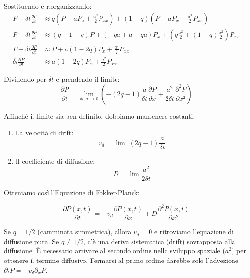 Sostituendo e riorganizzando:
\begin{equation}
\begin{aligned}
P + \delta t \frac{\partial P}{\partial t} &\approx q \left( P - a P_x + \frac{a^2}{2} P_{xx} \right) + (1-q) \left( P + a P_x + \frac{a^2}{2} P_{xx} \right) \\
P + \delta t \frac{\partial P}{\partial t} &\approx (q+1-q)P + (-qa + a - qa) P_x + \left(q \frac{a^2}{2} + (1-q)\frac{a^2}{2}\right) P_{xx} \\
P + \delta t \frac{\partial P}{\partial t} &\approx P + a(1-2q) P_x + \frac{a^2}{2} P_{xx} \\  
\delta t \frac{\partial P}{\partial t} &\approx  a(1-2q) P_x + \frac{a^2}{2} P_{xx}
\end{aligned}
\end{equation}

Dividendo per $\delta t$ e prendendo il limite:
\begin{equation}
\frac{\partial P}{\partial t} = \lim_{\delta t, a \to 0} \left( -(2q-1)\frac{a}{\delta t} \frac{\partial P}{\partial x} + \frac{a^2}{2 \delta t} \frac{\partial^2 P}{\partial x^2} \right)
\end{equation}

Affinché il limite sia ben definito, dobbiamo mantenere costanti:

\begin{enumerate}
    \item  La velocità di drift:
\begin{equation} 
v_d = \lim \;(2q-1) \frac{a}{\delta t} 
\end{equation}

\item Il coefficiente di diffusione:
\begin{equation} 
D = \lim \frac{a^2}{2 \delta t} 
\end{equation}
\end{enumerate}

Otteniamo così l'Equazione di Fokker-Planck:
\begin{tcolorbox}[colback=colorA!5,colframe=colorA, arc=3mm, boxrule=1.2pt]
\begin{equation}
\label{eq:fokker_planck}
\frac{\partial P(x,t)}{\partial t} = -v_d \frac{\partial P(x,t)}{\partial x} + D \frac{\partial^2 P(x,t)}{\partial x^2}
\end{equation}
\end{tcolorbox}

Se $q=1/2$ (camminata simmetrica), allora $v_d=0$ e ritroviamo l'equazione di diffusione pura.
Se $q \neq 1/2$, c'è una deriva sistematica (drift) sovrapposta alla diffusione.
È necessario arrivare al secondo ordine nello sviluppo spaziale ($a^2$) per ottenere il termine diffusivo. Fermarsi al primo ordine darebbe solo l'advezione $\partial_t P = -v_d \partial_x P$.

